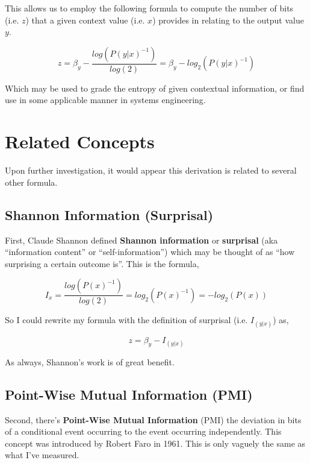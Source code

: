 \documentclass{article}
\begin{document}
This allows us to employ the following formula to compute the number of bits (i.e. $z$) that a given context value (i.e. $x$) provides in relating to the output value $y$.

\begin{equation}
z = \beta_{y} - \frac{log(P(y|x)^{-1})}{log(2)} = \beta_{y} - log_2(P(y|x)^{-1})
\end{equation}

Which may be used to grade the entropy of given contextual information, or find use in some applicable manner in systems engineering.

\section{Related Concepts}
Upon further investigation, it would appear this derivation is related to several other formula.

\subsection{Shannon Information (Surprisal)}

First, Claude Shannon defined \textbf{Shannon information} or \textbf{surprisal} (aka “information content” or “self-information”) which may be thought of as “how surprising a certain outcome is”. This is the formula,

\begin{equation}
I_{x} = \frac{log(P(x)^{-1})}{log(2)} = log_{2}(P(x)^{-1}) = -log_{2}(P(x))
\end{equation}

So I could rewrite my formula with the definition of surprisal (i.e. $I_{(y|x)}$) as,

\begin{equation}
z = \beta_{y} - I_{(y|x)}
\end{equation}

As always, Shannon’s work is of great benefit.

\subsection{Point-Wise Mutual Information (PMI)}

Second, there’s \textbf{Point-Wise Mutual Information} (PMI) the deviation in bits of a conditional event occurring to the event occurring independently. This concept was introduced by Robert Faro in 1961. This is only vaguely the same as what I’ve measured.
\end{document}

